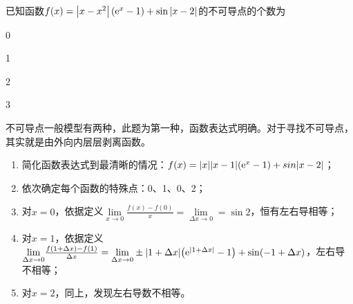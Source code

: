 \begin{problem}
	已知函数$f(x) =\left|x-x^2\right|({\rm e}^x-1)+\sin|x-2|$的不可导点的个数为\xparen
	
	\begin{xchoices}[showanswer = true]
		\item 0
		\item 1
		\item* 2
		\item 3
	\end{xchoices}
	\vspace{0.5em}
	\begin{solution}
		不可导点一般模型有两种，此题为第一种，函数表达式明确。对于寻找不可导点，其实就是由外向内层层剥离函数。
		\begin{enumerate}[label=(\arabic*)]
			\item 简化函数表达式到最清晰的情况：$f(x)= |x||x-1|({\rm e}^x-1)+sin|x-2|$；
			\item 依次确定每个函数的特殊点：0、1、0、2；
			\item 对$x=0$，依据定义$\underset{ x\rightarrow 0}{\lim}\frac{f(x)-f(0)}{x}=\underset{\Delta x\rightarrow 0}{\lim}=\sin 2$，恒有左右导相等；
			\item 对$x=1$，依据定义$\underset{\Delta x\rightarrow 0}{\lim}\frac{f(1+\Delta x)-f(1)}{\Delta x}=\underset{\Delta x\rightarrow 0}{\lim}\pm|1+\Delta x|\qty({\rm e}^{|1+\Delta x|}-1)+\sin(-1+\Delta x)$，左右导不相等；
			\item 对$x=2$，同上，发现左右导数不相等。
		\end{enumerate}
	\end{solution}
\end{problem}


